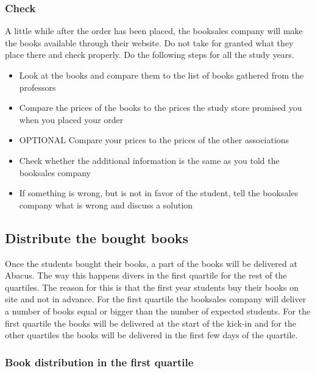 \documentclass{article}
\begin{document}
\subsubsection*{Check}
A little while after the order has been placed, the booksales company will make the books available through their website. Do not take for granted what they place there and check properly. Do the following steps for all the study years.

\begin{itemize} 
\vspace{-1mm}
\itemsep-1mm 
\item Look at the books and compare them to the list of books gathered from the professors 
\item Compare the prices of the books to the prices the study store promised you when you placed your order 
\item OPTIONAL Compare your prices to the prices of the other associations
\item Check whether the additional information is the same as you told the booksales company
\item If something is wrong, but is not in favor of the student, tell the booksales company what is wrong and discuss a solution
\end{itemize}

\subsection*{Distribute the bought books}
Once the students bought their books, a part of the books will be delivered at Abacus. The way this happens divers in the first quartile for the rest of the quartiles. The reason for this is that the first year students buy their books on site and not in advance. For the first quartile the booksales company will deliver a number of books equal or bigger than the number of expected students. For the first quartile the books will be delivered at the start of the kick-in and for the other quartiles the books will be delivered in the first few days of the quartile.   

\subsubsection*{Book distribution in the first quartile}
\end{document}

